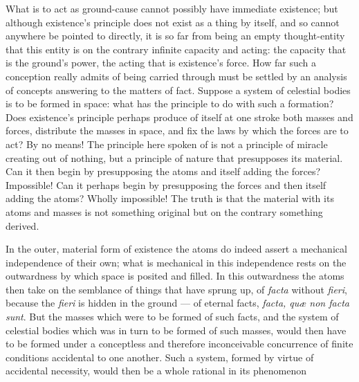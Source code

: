 \documentclass[12pt,a4paper]{book}
\begin{document}
What is to act as ground-cause cannot possibly have immediate existence; but
although existence's principle does not exist as a thing by itself, and so
cannot anywhere be pointed to directly, it is so far from being an empty
thought-entity that this entity is on the contrary infinite capacity and
acting: the capacity that is the ground's power, the acting that is existence's
force. How far such a conception really admits of being carried through must be
settled by an analysis of concepts answering to the matters of fact. Suppose a
system of celestial bodies is to be formed in space: what has the principle to
do with such a formation? Does existence's principle perhaps produce of itself
at one stroke both masses and forces, distribute the masses in space, and fix
the laws by which the forces are to act? By no means! The principle here spoken
of is not a principle of miracle creating out of nothing, but a principle of
nature that presupposes its material. Can it then begin by presupposing the
atoms and itself adding the forces? Impossible! Can it perhaps begin by
presupposing the forces and then itself adding the atoms? Wholly impossible!
The truth is that the material with its atoms and masses is not something
original but on the contrary something derived.

In the outer, material form of existence the atoms do indeed assert a
mechanical independence of their own; what is mechanical in this independence
rests on the outwardness by which space is posited and filled. In this
outwardness the atoms then take on the semblance of
things that have sprung up, of \textit{facta} without \textit{fieri}, because
the \textit{fieri} is hidden in the ground --- of eternal facts,
\textit{facta, quæ non facta sunt}. But the masses which were to be formed of
such facts, and the system of celestial bodies which was in turn to be formed
of such masses, would then have to be formed under a conceptless and therefore
inconceivable concurrence of finite conditions accidental to one another. Such
a system, formed by virtue of accidental necessity, would then be a whole
rational in its phenomenon
\end{document}

